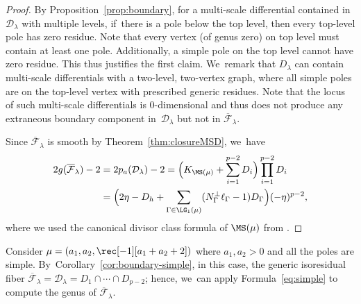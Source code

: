 \begin{proof}
By Proposition~\ref{prop:boundary}, for a multi-scale differential contained in $\mathcal D_\lambda$ with multiple levels, if~there is a pole below the top level, then every top-level pole has zero residue. Note that every vertex (of genus zero) on top level must contain at least one pole. Additionally, a simple pole on the top level cannot have zero residue. This thus justifies the first claim. We~remark that $D_\lambda$ can contain multi-scale differentials with a two-level, two-vertex graph, where all simple poles are on the top-level vertex with prescribed generic residues. Note that the locus of such multi-scale differentials is $0$\nobreakdash-dimensional and thus does not produce any extraneous boundary component in~$\mathcal D_\lambda$ but not in $\overline{\mathcal F}_\lambda$.

Since $\overline{\mathcal F}_\lambda$ is smooth by Theorem~\ref{thm:closureMSD}, we~have\vspace*{-5pt}
\begin{equation}
\begin{aligned}
2g(\overline{\mathcal F}_\lambda) - 2 & = 2p_a (\mathcal D_\lambda) - 2  = \Bigl(K_{\MS(\mu)} + \sum_{i=1}^{p-2}D_i\Bigr) \prod_{i=1}^{p-2} D_i \\
& = \Bigl( 2\eta - D_h + \sum_{\Gamma\in \LG_1(\mu)} (N_{\Gamma}^{\bot} \ell_\Gamma - 1) D_\Gamma \Bigr)(-\eta)^{p-2},
\end{aligned}
\end{equation}
where we used the canonical divisor class formula of $\MS(\mu)$ from \cite[Th.\,1.1]{CMZ}.
\end{proof}

Consider $\mu = (a_1, a_2, \rec[-1][a_1+a_2+2])$ where $a_1, a_2 > 0$ and all the poles are simple. By~Corollary~\ref{cor:boundary-simple}, in this case, the generic isoresidual fiber $\overline{\mathcal F}_\lambda = \mathcal D_\lambda = D_1\cap \cdots \cap D_{p-2}$; hence, we~can apply Formula~\eqref{eq:simple} to compute the genus of $\overline{\mathcal F}_\lambda$.

